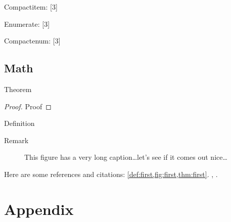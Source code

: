 \documentclass[italian,counters by chapter]{uniud}
\begin{document}
\blindtext[1]
Compactitem:
[3]

\blindtext[1]
Enumerate:
[3]

\blindtext[1]
Compactenum:
[3]
\blindtext[1]

\section{Math}

\begin{theorem}
	\label{thm:first}
	Theorem
\end{theorem}
\begin{proof}
	Proof
\end{proof}

\begin{definition}
	\label{def:first}
	Definition
\end{definition}

\begin{remark}
	\label{rem:first}
	Remark
\end{remark}

\begin{figure}[t]
\begin{center}
\end{center}
\caption{This figure has a very long caption\dots let's see if it comes out nice\dots}
\label{fig:first}
\end{figure}

Here are some references and citations: \cref{def:first,fig:first,thm:first}. , \cite{article,book,booklet,conference,inbook,incollection,manual,mastersthesis,misc,phdthesis,proceedings,techreport,unpublished}.


\blindmathpaper






\appendix

\chapter{Appendix}
\lipsum[1-7]
\end{document}
